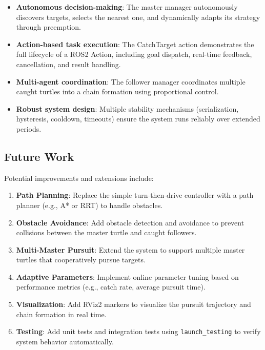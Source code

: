 \documentclass[12pt,a4paper]{article}
\begin{document}
\begin{itemize}
  \item \textbf{Autonomous decision-making}: The master manager autonomously discovers targets, selects the nearest one, and dynamically adapts its strategy through preemption.
  \item \textbf{Action-based task execution}: The CatchTarget action demonstrates the full lifecycle of a ROS2 Action, including goal dispatch, real-time feedback, cancellation, and result handling.
  \item \textbf{Multi-agent coordination}: The follower manager coordinates multiple caught turtles into a chain formation using proportional control.
  \item \textbf{Robust system design}: Multiple stability mechanisms (serialization, hysteresis, cooldown, timeouts) ensure the system runs reliably over extended periods.
\end{itemize}

\subsection{Future Work}

Potential improvements and extensions include:

\begin{enumerate}[label=\arabic*.]
  \item \textbf{Path Planning}: Replace the simple turn-then-drive controller with a path planner (e.g., A* or RRT) to handle obstacles.
  \item \textbf{Obstacle Avoidance}: Add obstacle detection and avoidance to prevent collisions between the master turtle and caught followers.
  \item \textbf{Multi-Master Pursuit}: Extend the system to support multiple master turtles that cooperatively pursue targets.
  \item \textbf{Adaptive Parameters}: Implement online parameter tuning based on performance metrics (e.g., catch rate, average pursuit time).
  \item \textbf{Visualization}: Add RViz2 markers to visualize the pursuit trajectory and chain formation in real time.
  \item \textbf{Testing}: Add unit tests and integration tests using \texttt{launch\_testing} to verify system behavior automatically.
\end{enumerate}

\appendix
\end{document}
